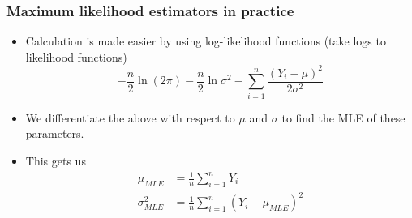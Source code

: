 \documentclass[aspectratio=169]{beamer}
\begin{document}
\begin{frame}
\frametitle{Maximum likelihood estimators in practice}
\begin{itemize}
\item Calculation is made easier by using log-likelihood functions (take logs to likelihood functions)
\[
-\frac{n}{2}\ln{(2\pi)}-\frac{n}{2}\ln{\sigma^2}-\sum_{i=1}^n\frac{(Y_i-\mu)^2}{2\sigma^2} 
\]
\item We differentiate the above with respect to $\mu$ and $\sigma$ to find the MLE of these parameters.
\item This gets us
\[
\begin{aligned}
\mu_{MLE}&=\frac{1}{n}\sum_{i=1}^nY_i\\
\sigma^2_{MLE}&=\frac{1}{n}\sum_{i=1}^n(Y_i-\mu_{MLE})^2
\end{aligned}
\]
\end{itemize}
\end{frame}


\end{document}
